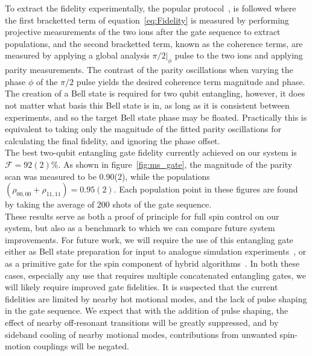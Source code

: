     To extract the fidelity experimentally, the popular
    protocol~\cite{}, is followed where the first bracketted term of
    equation~\ref{eq:Fidelity} is measured by performing projective measurements
    of the two ions after the gate sequence to extract populations, and the second bracketted term,
    known as the coherence terms, are measured by applying a global analysis
    $\pi/2|_\phi$ pulse to the two ions and applying parity measurements.  The
    contrast of the parity oscillations when varying the phase $\phi$ of the
    $\pi/2$ pulse yields the desired coherence term magnitude and phase. The creation of a Bell state is required for two qubit entangling, however, it does not matter what basis this Bell state is in, as long as it is consistent between experiments, and so the target Bell state phase may be floated. Practically this is equivalent to taking only the magnitude of the fitted parity oscillations for calculating the final fidelity, and ignoring the phase offset.\\
    The best two-qubit entangling gate fidelity currently achieved on our system is $\mathcal{F}=92(2)\%$. As shown in figure~\ref{fig:ms_gate}, the magnitude of the parity scan was measured to be 0.90(2), while the populations $\left( \rho_{00,00} + \rho_{11,11} \right) = 0.95(2)$. Each population point in these figures are found by taking the average of 200 shots of the gate sequence.\\

    These results serve as both a proof of principle for full spin control on
    our system, but also as a benchmark to which we can compare future system
    improvements.  For future work, we will require the use of this entangling
    gate either as Bell state preparation for input to analogue simulation
    experiments~\cite{}, or as a primitive gate for the spin component of hybrid
    algorithms~\cite{}.  In both these cases, especially any use that requires
    multiple concatenated entangling gates, we will likely require improved gate
    fidelities. It is suspected that the current fidelities are limited by nearby hot
    motional modes, and the lack of pulse shaping in the gate sequence. We
    expect that with the addition of pulse shaping, 
    the effect of nearby off-resonant transitions will be greatly suppressed, and by sideband cooling of
    nearby motional modes, contributions from unwanted
    spin-motion couplings will be negated.\\
